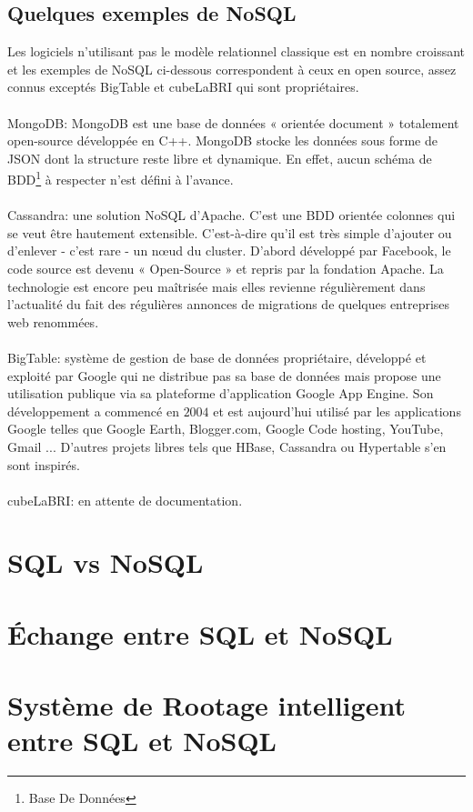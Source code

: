 \subsection{Quelques exemples de \textsf{NoSQL}}

Les logiciels n'utilisant pas le modèle relationnel classique est en
nombre croissant et les exemples de \textsf{NoSQL} ci-dessous correspondent à ceux en open source, assez connus exceptés
\textsf{BigTable} et \textsf{cubeLaBRI} qui sont propriétaires.
\\\\ {\sf MongoDB}: MongoDB est une base de données « \textsf{orientée
    document} » totalement open-source développée en
\textsf{C++}. MongoDB stocke les données sous forme de \textsf{JSON}
dont la structure reste libre et dynamique.  En effet, aucun schéma de
\textsf{BDD}\footnote{Base De Données} à respecter n'est défini à
l'avance.\cite{mongoDB} \\\\ \textsf{Cassandra}:  une
solution \textsf{NoSQL} d’\textsf{Apache}.  C’est une \textsf{BDD} orientée colonnes
qui se veut être hautement extensible. C’est-à-dire qu’il est très
simple d’ajouter ou d’enlever - c’est rare - un nœud du
cluster. D’abord développé par \textsf{Facebook}, le code source est devenu
« \textsf{Open-Source} » et repris par la fondation \textsf{Apache}\cite{cassandra}.  La
technologie est encore peu maîtrisée mais elles revienne régulièrement
dans l’actualité du fait des régulières annonces de migrations de
quelques entreprises \textsf{web} renommées\cite{cassandra2}.
\\\\ \textsf{BigTable}:  système de gestion de base de
données propriétaire, développé et exploité par Google qui ne
distribue pas sa base de données mais propose une utilisation publique
via sa plateforme d'application \textsf{Google App Engine}. Son
développement a commencé en $2004$ et est aujourd'hui utilisé par les
applications \textsf{Google} telles que \textsf{Google Earth},
\textsf{Blogger.com}, \textsf{Google Code hosting}, \textsf{YouTube},
\textsf{Gmail} ... D'autres projets libres tels que \textsf{HBase},
\textsf{Cassandra} ou \textsf{Hypertable} s'en sont
inspirés.\\\\ {\color{red} \textsf{cubeLaBRI}: en
  attente de documentation.}

\section{\textsf{SQL} vs \textsf{NoSQL}}


\section{Échange entre \textsf{SQL} et \textsf{NoSQL}}


\section{Système de Rootage intelligent entre \textsf{SQL} et \textsf{NoSQL}}

